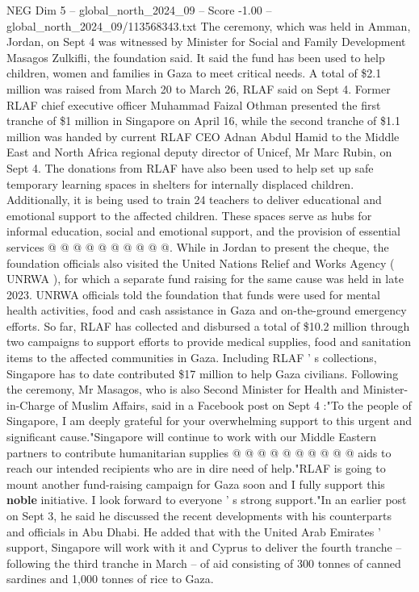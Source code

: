 \begin{textsample}{NEG Dim 5 – global\_north\_2024\_09 – Score -1.00 – global\_north\_2024\_09/113568343.txt}  \label{ex:f5_neg_140}
The ceremony, which was held in Amman, Jordan, on Sept 4 was witnessed by Minister for Social and Family Development Masagos Zulkifli, the foundation said.
It said the fund has been used to help children, women and families in Gaza to meet critical needs.
A total of \$2.1 million was raised from March 20 to March 26, RLAF said on Sept 4.
Former RLAF chief executive officer Muhammad Faizal Othman presented the first tranche of \$1 million in Singapore on April 16, while the second tranche of \$1.1 million was handed by current RLAF CEO Adnan Abdul Hamid to the Middle East and North Africa regional deputy director of Unicef, Mr Marc Rubin, on Sept 4.
The donations from RLAF have also been used to help set up safe temporary learning spaces in shelters for internally displaced children.
Additionally, it is being used to train 24 teachers to deliver educational and emotional support to the affected children.
These spaces serve as hubs for informal education, social and emotional support, and the provision of essential services @ @ @ @ @ @ @ @ @ @.
While in Jordan to present the cheque, the foundation officials also visited the United Nations Relief and Works Agency ( UNRWA ), for which a separate fund raising for the same cause was held in late 2023.
UNRWA officials told the foundation that funds were used for mental health activities, food and cash assistance in Gaza and on-the-ground emergency efforts.
So far, RLAF has collected and disbursed a total of \$10.2 million through two campaigns to support efforts to provide medical supplies, food and sanitation items to the affected communities in Gaza.
Including RLAF ' s collections, Singapore has to date contributed \$17 million to help Gaza civilians.
Following the ceremony, Mr Masagos, who is also Second Minister for Health and Minister-in-Charge of Muslim Affairs, said in a Facebook post on Sept 4 :"To the people of Singapore, I am deeply grateful for your overwhelming support to this urgent and significant cause."Singapore will continue to work with our Middle Eastern partners to contribute humanitarian supplies @ @ @ @ @ @ @ @ @ @ aids to reach our intended recipients who are in dire need of help."RLAF is going to mount another fund-raising campaign for Gaza soon and I fully support this \textbf{noble} initiative.
I look forward to everyone ' s strong support."In an earlier post on Sept 3, he said he discussed the recent developments with his counterparts and officials in Abu Dhabi.
He added that with the United Arab Emirates ' support, Singapore will work with it and Cyprus to deliver the fourth tranche -- following the third tranche in March -- of aid consisting of 300 tonnes of canned sardines and 1,000 tonnes of rice to Gaza.

\end{textsample}
